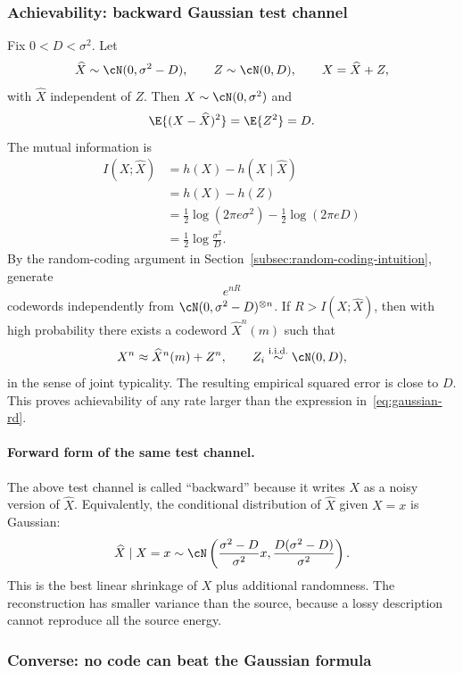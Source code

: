\subsubsection*{Achievability: backward Gaussian test channel}

Fix $0<D<\sigma^2$.
Let
\begin{equation}
    \widehat X\sim \cN(0,\sigma^2-D),
    \qquad
    Z\sim \cN(0,D),
    \qquad
    X=\widehat X+Z,
\end{equation}
with $\widehat X$ independent of $Z$.
Then $X\sim\cN(0,\sigma^2)$ and
\[
    \E{(X-\widehat X)^2}=\E{Z^2}=D.
\]
The mutual information is
\begin{align}
    I(X;\widehat X)
    &= h(X)-h(X\mid \widehat X) \\
    &= h(X)-h(Z) \\
    &= \frac12\log(2\pi e\sigma^2)-\frac12\log(2\pi eD) \\
    &= \frac12\log\frac{\sigma^2}{D}.
\end{align}
By the random-coding argument in Section~\ref{subsec:random-coding-intuition}, generate
\[
    e^{nR}
\]
codewords independently from $\cN(0,\sigma^2-D)^{\otimes n}$.
If $R>I(X;\widehat X)$, then with high probability there exists a codeword $\widehat X^n(m)$ such that
\[
    X^n\approx \widehat X^n(m)+Z^n,
    \qquad Z_i\overset{\text{i.i.d.}}{\sim}\cN(0,D),
\]
in the sense of joint typicality.
The resulting empirical squared error is close to $D$.
This proves achievability of any rate larger than the expression in~\eqref{eq:gaussian-rd}.

\paragraph{Forward form of the same test channel.}
The above test channel is called ``backward'' because it writes $X$ as a noisy version of $\widehat X$.
Equivalently, the conditional distribution of $\widehat X$ given $X=x$ is Gaussian:
\begin{equation}
    \widehat X\mid X=x
    \sim
    \cN\left(\frac{\sigma^2-D}{\sigma^2}x,
    \frac{D(\sigma^2-D)}{\sigma^2}\right).
\end{equation}
This is the best linear shrinkage of $X$ plus additional randomness.
The reconstruction has smaller variance than the source, because a lossy description cannot reproduce all the source energy.

\subsubsection*{Converse: no code can beat the Gaussian formula}

